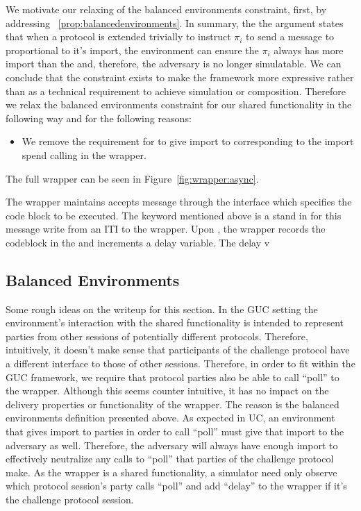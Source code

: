 We motivate our relaxing of the balanced environments constraint, first, by addressing ~\ref{prop:balancedenvironments}. 
In summary, the the argument states that when a protocol is extended trivially to instruct $\pi_i$ to send a message to \Adversary proportional to it's import, the environment can ensure the $\pi_i$ always has more import than the \Adversary and, therefore, the adversary is no longer simulatable. 
We can conclude that the constraint exists to make the framework more expressive rather than as a technical requirement to achieve simulation or composition. 
Therefore we relax the balanced environments constraint for our shared functionality in the following way and for the following reasons:
\begin{itemize}
\item We remove the requirement for \Environment to give import to \Adversary corresponding to the import spend calling \Advance in the wrapper.  
\end{itemize}

The full wrapper can be seen in Figure~\ref{fig:wrapper:async}.

The wrapper maintains accepts message through the  interface which specifies the code block to be executed.
The \Eventually keyword mentioned above is a stand in for this message write from an ITI to the wrapper.
Upon , the wrapper records the codeblock in the  and increments a delay variable.
The delay v


\subsection{Balanced Environments}
Some rough ideas on the writeup for this section.
In the GUC setting the environment’s interaction with the shared functionality is intended to represent parties from other sessions of potentially different protocols. 
Therefore, intuitively, it doesn’t make sense that participants of the challenge protocol have a different interface to those of other sessions. 
Therefore, in order to fit within the GUC framework, we require that protocol parties also be able to call “poll” to the wrapper. 
Although this seems counter intuitive, it has no impact on the delivery properties or functionality of the wrapper. 
The reason is the balanced environments definition presented above. 
As expected in UC, an environment that gives import to parties in order to call “poll” must give that import to the adversary as well. 
Therefore, the adversary will always have enough import to effectively neutralize any calls to “poll” that parties of the challenge protocol make. 
As the wrapper is a shared functionality, a simulator need only observe which protocol session’s party calls “poll” and add “delay” to the wrapper if it’s the challenge protocol session.  

